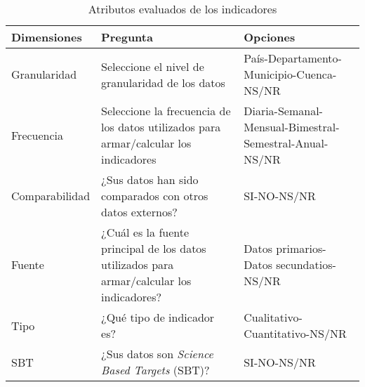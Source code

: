 
\begin{table}[H]
    \centering
    \begin{tabular}{p{3cm} | p{7cm} | p{4.5cm}}
        \textbf{Dimensiones} & \textbf{Pregunta} & \textbf{Opciones} \\
        \hline\hline
        Granularidad & Seleccione el nivel de granularidad de los datos&País-Departamento-Municipio-Cuenca-NS/NR\\
        \hline
        Frecuencia & Seleccione la frecuencia de los datos utilizados para armar/calcular los indicadores&Diaria-Semanal-Mensual-Bimestral-Semestral-Anual-NS/NR\\
        \hline
        Comparabilidad & ¿Sus datos han sido comparados con otros datos externos?&SI-NO-NS/NR\\
        \hline
        Fuente & ¿Cuál es la fuente principal de los datos utilizados para armar/calcular los indicadores?& Datos primarios-Datos secundatios-NS/NR\\
        \hline
        Tipo & ¿Qué tipo de indicador es?&Cualitativo-Cuantitativo-NS/NR\\
        \hline
        SBT & ¿Sus datos son \textit{Science Based Targets} (SBT)?& SI-NO-NS/NR\\
        \hline
    \end{tabular}
    \caption{Atributos evaluados de los indicadores}
    \label{tab:atributos-indicadores}
\end{table}